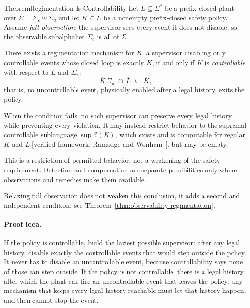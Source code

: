 \documentclass[11pt,a4paper]{article}
\theoremstyle{definition}
\theoremstyle{remark}
\begin{document}
\begin{pdclaim}{Theorem}{Regimentation Is Controllability}\label{thm:regimentation-controllability}
\setlength{\parskip}{3pt plus 1pt}
Let $L \subseteq \Sigma^{*}$ be a prefix-closed plant over $\Sigma = \Sigma_c \uplus \Sigma_u$
and let $K \subseteq L$ be a nonempty prefix-closed safety policy. Assume \emph{full
observation}: the supervisor sees every event it does not disable, so the observable
subalphabet $\Sigma_o$ is all of $\Sigma$.

There exists a
regimentation mechanism for $K$, a supervisor disabling only controllable events whose closed
loop is exactly $\overline{K}$, if and only if $K$ is \emph{controllable} with respect to $L$
and $\Sigma_u$:
\[
  \overline{K}\,\Sigma_u \;\cap\; \overline{L} \;\subseteq\; \overline{K},
\]
that is, no uncontrollable event, physically enabled after a legal history, exits the policy.

When the condition fails, no such supervisor can preserve every legal history
while preventing every violation. It may instead restrict behavior to the
supremal controllable sublanguage
$\sup\mathcal{C}(K)$, which exists and is computable for regular $K$ and $L$
[verified framework: Ramadge and Wonham~], but may be empty.

This is a restriction of permitted behavior, not a weakening of the safety
requirement. Detection and compensation are separate possibilities only where
observations and remedies make them available.

Relaxing full observation does not weaken this conclusion, it adds a second and independent
condition: see Theorem~\ref{thm:observability-regimentation}.
\end{pdclaim}

\paragraph{Proof idea.}
If the policy is controllable, build the laziest possible supervisor: after any legal
history, disable exactly the controllable events that would step outside the policy. It never
has to disable an uncontrollable event, because controllability says none of those can step
outside. If the policy is not controllable, there is a legal history after which the plant
can fire an uncontrollable event that leaves the policy; any mechanism that keeps every legal
history reachable must let that history happen, and then cannot stop the event.
\end{document}
